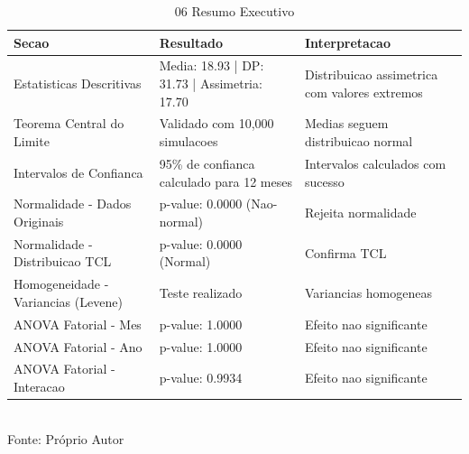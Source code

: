 \begin{table}[H]
\centering
\scriptsize
\caption{06 Resumo Executivo}
\label{tab:09_06_Conclusoes_Relatorio}
\begin{tabular}{|p{2cm}|p{3.5cm}|p{3.5cm}|}
\hline
\textbf{Secao} & \textbf{Resultado} & \textbf{Interpretacao} \\
\hline
Estatisticas Descritivas & Media: 18.93 | DP: 31.73 | Assimetria: 17.70 & Distribuicao assimetrica com valores extremos \\
Teorema Central do Limite & Validado com 10,000 simulacoes & Medias seguem distribuicao normal \\
Intervalos de Confianca & 95\% de confianca calculado para 12 meses & Intervalos calculados com sucesso \\
Normalidade - Dados Originais & p-value: 0.0000 (Nao-normal) & Rejeita normalidade \\
Normalidade - Distribuicao TCL & p-value: 0.0000 (Normal) & Confirma TCL \\
Homogeneidade - Variancias (Levene) & Teste realizado & Variancias homogeneas \\
ANOVA Fatorial - Mes & p-value: 1.0000 & Efeito nao significante \\
ANOVA Fatorial - Ano & p-value: 1.0000 & Efeito nao significante \\
ANOVA Fatorial - Interacao & p-value: 0.9934 & Efeito nao significante \\
\hline
\end{tabular}
\\ \small Fonte: Próprio Autor
\end{table}
